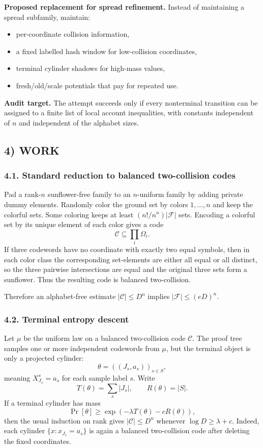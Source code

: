 \textbf{Proposed replacement for spread refinement.}
Instead of maintaining a spread subfamily, maintain:
\begin{itemize}
\item per-coordinate collision information,
\item a fixed labelled hash window for low-collision coordinates,
\item terminal cylinder shadows for high-mass values,
\item fresh/old/scale potentials that pay for repeated use.
\end{itemize}

\textbf{Audit target.}
The attempt succeeds only if every nonterminal transition can be assigned to a
finite list of local account inequalities, with constants independent of $n$
and independent of the alphabet sizes.

\subsection{4) WORK}

\subsubsection*{4.1. Standard reduction to balanced two-collision codes}

Pad a rank-$n$ sunflower-free family to an $n$-uniform family by adding private
dummy elements.  Randomly color the ground set by colors $1,\ldots,n$ and keep
the colorful sets.  Some coloring keeps at least $(n!/n^n)|\mathcal F|$ sets.
Encoding a colorful set by its unique element of each color gives a code
\[
  \mathcal C\subseteq \prod_i\Omega_i .
\]
If three codewords have no coordinate with exactly two equal symbols, then in
each color class the corresponding set-elements are either all equal or all
distinct, so the three pairwise intersections are equal and the original three
sets form a sunflower.  Thus the resulting code is balanced two-collision.

Therefore an alphabet-free estimate $|\mathcal C|\le D^n$ implies
$|\mathcal F|\le (eD)^n$.

\subsubsection*{4.2. Terminal entropy descent}

Let $\mu$ be the uniform law on a balanced two-collision code $\mathcal C$.
The proof tree samples one or more independent codewords from $\mu$, but the
terminal object is only a projected cylinder:
\[
  \theta=((J_s,a_s))_{s\in S},
\]
meaning $X^s_{J_s}=a_s$ for each sample label $s$.  Write
\[
  T(\theta)=\sum_s |J_s|,\qquad R(\theta)=|S|.
\]
If a terminal cylinder has mass
\[
  \Pr[\theta]\ge \exp(-\lambda T(\theta)-cR(\theta)),
\]
then the usual induction on rank gives $|\mathcal C|\le D^n$ whenever
$\log D\ge \lambda+c$.  Indeed, each cylinder
$\{x:x_{J_s}=a_s\}$ is again a balanced two-collision code after deleting the
fixed coordinates.

